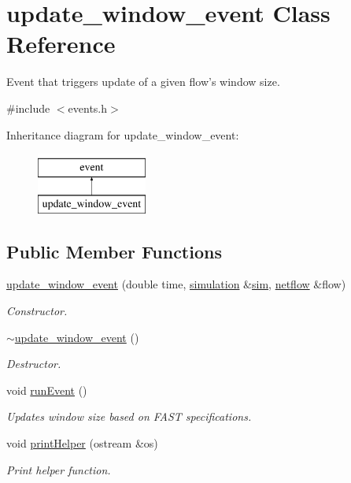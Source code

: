 \hypertarget{classupdate__window__event}{\section{update\-\_\-window\-\_\-event Class Reference}
\label{classupdate__window__event}
}


Event that triggers update of a given flow's window size.  




{\ttfamily \#include $<$events.\-h$>$}

Inheritance diagram for update\-\_\-window\-\_\-event\-:\begin{figure}[H]
\begin{center}
\leavevmode
\includegraphics[height=2.000000cm]{classupdate__window__event}
\end{center}
\end{figure}
\subsection*{Public Member Functions}
\begin{DoxyCompactItemize}
\item 
\hyperlink{classupdate__window__event_ae243ddae54a04702f79154e0737f18c1}{update\-\_\-window\-\_\-event} (double time, \hyperlink{classsimulation}{simulation} \&\hyperlink{classevent_a08c6d828bfb6f5539dcd1491e8ac77d2}{sim}, \hyperlink{classnetflow}{netflow} \&flow)
\begin{DoxyCompactList}\small\item\em Constructor. \end{DoxyCompactList}\item 
\hyperlink{classupdate__window__event_a6210f1bc9245acd5f9038bc985528258}{$\sim$update\-\_\-window\-\_\-event} ()
\begin{DoxyCompactList}\small\item\em Destructor. \end{DoxyCompactList}\item 
void \hyperlink{classupdate__window__event_a41d9c1b343cd0ddceef94de6bc4abb68}{run\-Event} ()
\begin{DoxyCompactList}\small\item\em Updates window size based on F\-A\-S\-T specifications. \end{DoxyCompactList}\item 
void \hyperlink{classupdate__window__event_ae533c05504abbf5dd9285a375c44e307}{print\-Helper} (ostream \&os)
\begin{DoxyCompactList}\small\item\em Print helper function. \end{DoxyCompactList}\end{DoxyCompactItemize}
